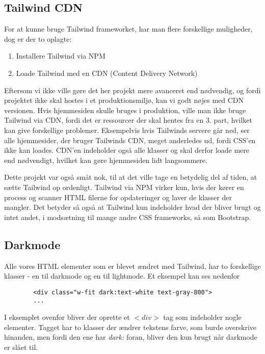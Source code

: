 \documentclass[a4paper,12pt]{extarticle}
\begin{document}
    \subsection{Tailwind CDN}
    For at kunne bruge Tailwind frameworket, har man flere forskellige muligheder, dog er der to oplagte:
    \begin{enumerate}
        \item Installere Tailwind via NPM
        \item Loade Tailwind med en CDN (Content Delivery Network)
    \end{enumerate}
    Eftersom vi ikke ville gøre det her projekt mere avanceret end nødvendig, og fordi projektet ikke skal hostes i et produktionsmiljø, kan vi godt nøjes med CDN versionen.
    Hvis hjemmesiden skulle bruges i produktion, ville man ikke bruge Tailwind via CDN, fordi det er ressourcer der skal hentes fra en 3. part, hvilket kan give forskellige problemer.
    Eksempelvis hvis Tailwinds servere går ned, ser alle hjemmesider, der bruger Tailwinds CDN, meget anderledes ud, fordi CSS'en ikke kan loades.
    CDN'en indeholder også alle klasser og skal derfor loade mere end nødvendigt, hvilket kan gøre hjemmesiden lidt langsommere.

    \medskip

    Dette projekt var også småt nok, til at det ville tage en betydelig del af tiden, at sætte Tailwind op ordenligt.
    Tailwind via NPM virker kun, hvis der kører en process og scanner HTML filerne for opdateringer og laver de klasser der mangler.
    Det betyder så også at Tailwind kun indeholder hvad der bliver brugt og intet andet, i modsætning til mange andre CSS frameworks, så som Bootstrap.

    \subsection{Darkmode}
    Alle vores HTML elementer som er blevet ændret med Tailwind, har to forskellige klasser - en til darkmode og en til lightmode.
    Et eksempel kan ses nedenfor

    \begin{verbatim}
        <div class="w-fit dark:text-white text-gray-800">
        ...
    \end{verbatim}

    I eksemplet ovenfor bliver der oprette et $<div>$ tag som indeholder nogle elementer.
    Tagget har to klasser der ændrer tekstens farve, som burde overskrive hinanden, men fordi den ene har \emph{dark:} foran,
    bliver den kun brugt når darkmode er slået til.
\end{document}
